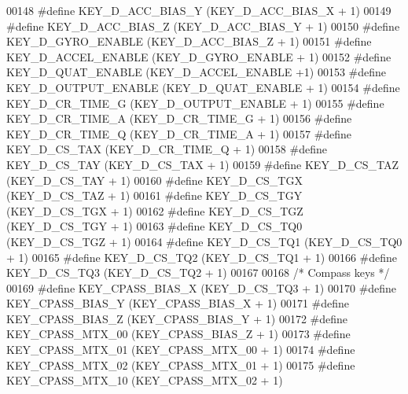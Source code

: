 \begin{DoxyCode}
00148 \textcolor{preprocessor}{#define KEY\_D\_ACC\_BIAS\_Y                (KEY\_D\_ACC\_BIAS\_X + 1)}
00149 \textcolor{preprocessor}{#define KEY\_D\_ACC\_BIAS\_Z                (KEY\_D\_ACC\_BIAS\_Y + 1)}
00150 \textcolor{preprocessor}{#define KEY\_D\_GYRO\_ENABLE               (KEY\_D\_ACC\_BIAS\_Z + 1)}
00151 \textcolor{preprocessor}{#define KEY\_D\_ACCEL\_ENABLE              (KEY\_D\_GYRO\_ENABLE + 1)}
00152 \textcolor{preprocessor}{#define KEY\_D\_QUAT\_ENABLE               (KEY\_D\_ACCEL\_ENABLE +1)}
00153 \textcolor{preprocessor}{#define KEY\_D\_OUTPUT\_ENABLE             (KEY\_D\_QUAT\_ENABLE + 1)}
00154 \textcolor{preprocessor}{#define KEY\_D\_CR\_TIME\_G                 (KEY\_D\_OUTPUT\_ENABLE + 1)}
00155 \textcolor{preprocessor}{#define KEY\_D\_CR\_TIME\_A                 (KEY\_D\_CR\_TIME\_G + 1)}
00156 \textcolor{preprocessor}{#define KEY\_D\_CR\_TIME\_Q                 (KEY\_D\_CR\_TIME\_A + 1)}
00157 \textcolor{preprocessor}{#define KEY\_D\_CS\_TAX                    (KEY\_D\_CR\_TIME\_Q + 1)}
00158 \textcolor{preprocessor}{#define KEY\_D\_CS\_TAY                    (KEY\_D\_CS\_TAX + 1)}
00159 \textcolor{preprocessor}{#define KEY\_D\_CS\_TAZ                    (KEY\_D\_CS\_TAY + 1)}
00160 \textcolor{preprocessor}{#define KEY\_D\_CS\_TGX                    (KEY\_D\_CS\_TAZ + 1)}
00161 \textcolor{preprocessor}{#define KEY\_D\_CS\_TGY                    (KEY\_D\_CS\_TGX + 1)}
00162 \textcolor{preprocessor}{#define KEY\_D\_CS\_TGZ                    (KEY\_D\_CS\_TGY + 1)}
00163 \textcolor{preprocessor}{#define KEY\_D\_CS\_TQ0                    (KEY\_D\_CS\_TGZ + 1)}
00164 \textcolor{preprocessor}{#define KEY\_D\_CS\_TQ1                    (KEY\_D\_CS\_TQ0 + 1)}
00165 \textcolor{preprocessor}{#define KEY\_D\_CS\_TQ2                    (KEY\_D\_CS\_TQ1 + 1)}
00166 \textcolor{preprocessor}{#define KEY\_D\_CS\_TQ3                    (KEY\_D\_CS\_TQ2 + 1)}
00167 
00168 \textcolor{comment}{/* Compass keys */}
00169 \textcolor{preprocessor}{#define KEY\_CPASS\_BIAS\_X            (KEY\_D\_CS\_TQ3 + 1)}
00170 \textcolor{preprocessor}{#define KEY\_CPASS\_BIAS\_Y            (KEY\_CPASS\_BIAS\_X + 1)}
00171 \textcolor{preprocessor}{#define KEY\_CPASS\_BIAS\_Z            (KEY\_CPASS\_BIAS\_Y + 1)}
00172 \textcolor{preprocessor}{#define KEY\_CPASS\_MTX\_00            (KEY\_CPASS\_BIAS\_Z + 1)}
00173 \textcolor{preprocessor}{#define KEY\_CPASS\_MTX\_01            (KEY\_CPASS\_MTX\_00 + 1)}
00174 \textcolor{preprocessor}{#define KEY\_CPASS\_MTX\_02            (KEY\_CPASS\_MTX\_01 + 1)}
00175 \textcolor{preprocessor}{#define KEY\_CPASS\_MTX\_10            (KEY\_CPASS\_MTX\_02 + 1)}

\end{DoxyCode}
